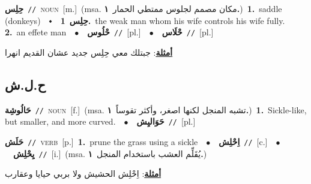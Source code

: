 \documentclass[10pt,a4paper,twoside]{article} %
\begin{document}
\begin{multicols}{2}
{\setlength\topsep{0pt}\textbf{\foreignlanguage{arabic}{حِلِس}}\ {\color{gray}\texttt{//}\color{black}}\ \textsc{noun}\ [m.]\ \color{gray}(msa. \foreignlanguage{arabic}{مكان مصمم لجلوس ممتطي الحمار}~\foreignlanguage{arabic}{\textbf{١.}})\color{black}\ \textbf{1.}~saddle (donkeys)\ \ $\smblkdiamond$\ \ \setlength\topsep{0pt}\textbf{\foreignlanguage{arabic}{حِلِس}}\ \textbf{1.}~the weak man whom his wife controls his wife fully.  \textbf{2.}~an effete man\ \ $\bullet$\ \ \setlength\topsep{0pt}\textbf{\foreignlanguage{arabic}{حْلُوس}}\ {\color{gray}\texttt{//}\color{black}}\ [pl.]\ \ $\bullet$\ \ \setlength\topsep{0pt}\textbf{\foreignlanguage{arabic}{حْلَاس}}\ {\color{gray}\texttt{//}\color{black}}\ [pl.]\  \begin{flushright}\color{gray}\foreignlanguage{arabic}{\textbf{\underline{\foreignlanguage{arabic}{أمثلة}}}: جبتلك معي حِلِس جديد عشان القديم انهرا}\end{flushright}\color{black}} \vspace{2mm}

\vspace{-3mm}
\subsection*{\color{blue}\foreignlanguage{arabic}{ح.ل.ش}\color{blue}{}} 

{\setlength\topsep{0pt}\textbf{\foreignlanguage{arabic}{حَالُوشِة}}\ {\color{gray}\texttt{//}\color{black}}\ \textsc{noun}\ [f.]\ \color{gray}(msa. \foreignlanguage{arabic}{تشبه المنجل لكنها اصغر، وأكثر تقوساً}~\foreignlanguage{arabic}{\textbf{١.}})\color{black}\ \textbf{1.}~Sickle-like, but smaller, and more curved.\ \ $\bullet$\ \ \setlength\topsep{0pt}\textbf{\foreignlanguage{arabic}{حَوَاليِش}}\ {\color{gray}\texttt{//}\color{black}}\ [pl.]\ } \vspace{2mm}

{\setlength\topsep{0pt}\textbf{\foreignlanguage{arabic}{حَلَش}}\ {\color{gray}\texttt{//}\color{black}}\ \textsc{verb}\ [p.]\ \textbf{1.}~prune the grass using a sickle\ \ $\bullet$\ \ \setlength\topsep{0pt}\textbf{\foreignlanguage{arabic}{اِحْلِش}}\ {\color{gray}\texttt{//}\color{black}}\ [c.]\ \ $\bullet$\ \ \setlength\topsep{0pt}\textbf{\foreignlanguage{arabic}{يِحْلِش}}\ {\color{gray}\texttt{//}\color{black}}\ [i.]\ \color{gray}(msa. \foreignlanguage{arabic}{يُقَلِّم العشب باستخدام المنجل}~\foreignlanguage{arabic}{\textbf{١.}})\color{black}\  \begin{flushright}\color{gray}\foreignlanguage{arabic}{\textbf{\underline{\foreignlanguage{arabic}{أمثلة}}}: اِحْلِش الحشيش ولا بربي حيايا وعقارب}\end{flushright}\color{black}} \vspace{2mm}


\end{multicols}
\end{document}
